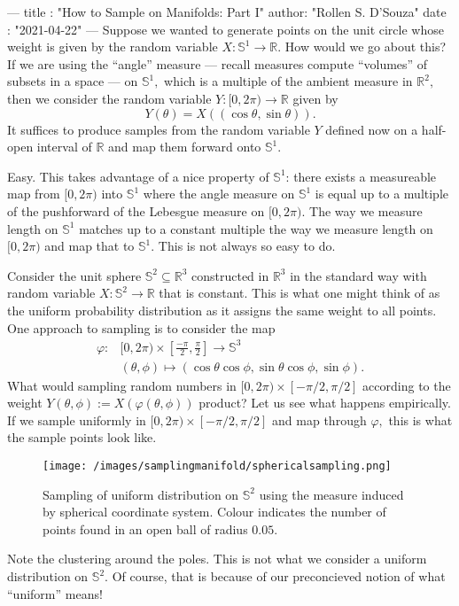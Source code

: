 ---
title :   "How to Sample on Manifolds: Part I"
author:   "Rollen S. D'Souza"
date  :   "2021-04-22"
---
Suppose we wanted to generate points on the unit circle whose weight is given by the random variable \(X: \mathbb{S}^1 \to \mathbb{R}.\)
How would we go about this?
If we are using the ``angle'' measure --- recall measures compute ``volumes'' of subsets in a space --- on \(\mathbb{S}^1,\) which is a multiple of the ambient measure in \(\mathbb{R}^2,\) then we consider the random variable \(Y: [0, 2\pi) \to \mathbb{R}\) given by
\[
  Y(\theta) = X\left( (\cos \theta, \sin \theta) \right).
\]
It suffices to produce samples from the random variable \(Y\) defined now on a half-open interval of \(\mathbb{R}\) and map them forward onto \(\mathbb{S}^1.\)

Easy.
This takes advantage of a nice property of \(\mathbb{S}^1\):
there exists a measureable map from \([0, 2\pi)\) into \(\mathbb{S}^1\) where the angle measure on \(\mathbb{S}^1\) is equal up to a multiple of the pushforward of the Lebesgue measure on \([0, 2\pi).\)
The way we measure length on \(\mathbb{S}^1\) matches up to a constant multiple the way we measure length on \([0, 2\pi)\) and map that to \(\mathbb{S}^1.\)
This is not always so easy to do.

Consider the unit sphere \(\mathbb{S}^2 \subseteq \mathbb{R}^3\) constructed in \(\mathbb{R}^3\) in the standard way with random variable \(X: \mathbb{S}^2 \to \mathbb{R}\) that is constant.
This is what one might think of as the uniform probability distribution as it assigns the same weight to all points.
One approach to sampling is to consider the map
\[
\begin{aligned}
  \varphi: &[0, 2\pi) \times \left[\frac{-\pi}{2}, \frac{\pi}{2}\right] \to \mathbb{S}^3\\
    &(\theta, \phi) \mapsto \left(\cos\theta \cos\phi, \sin\theta \cos\phi, \sin\phi\right).
\end{aligned}
\]
What would sampling random numbers in \([0, 2\pi) \times [-\pi/2, \pi/2]\) according to the weight \(Y(\theta, \phi) := X(\varphi(\theta,\phi))\) product?
Let us see what happens empirically.
If we sample uniformly in \([0, 2\pi) \times [-\pi/2, \pi/2]\) and map through \(\varphi,\) this is what the sample points look like.
%
\begin{figure}
  \texttt{[image: /images/samplingmanifold/sphericalsampling.png]}
  \caption{Sampling of uniform distribution on \(\mathbb{S}^2\) using the measure induced by spherical coordinate system. Colour indicates the number of points found in an open ball of radius \(0.05.\)}
\end{figure}
%
Note the clustering around the poles.
This is not what we consider a uniform distribution on \(\mathbb{S}^2.\)
Of course, that is because of our preconcieved notion of what ``uniform'' means!

